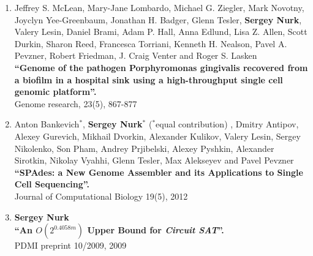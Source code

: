 \begin{enumerate}

\item Jeffrey S. McLean, Mary-Jane Lombardo, Michael G. Ziegler, Mark Novotny, Joyclyn Yee-Greenbaum, Jonathan H. Badger, Glenn Tesler, \textbf{Sergey Nurk}, Valery Lesin, Daniel Brami, Adam P. Hall, Anna Edlund, Lisa Z. Allen, Scott Durkin, Sharon Reed, Francesca Torriani, Kenneth H. Nealson, Pavel A. Pevzner, Robert Friedman, J. Craig Venter and Roger S. Lasken \\
\textbf{``Genome of the pathogen Porphyromonas gingivalis recovered from a biofilm in a hospital sink using a high-throughput single cell genomic platform''.} \\
Genome research, 23(5), 867-877

\item Anton Bankevich$^*$, \textbf{Sergey Nurk}$^*$ ($^*$equal contribution)%
, Dmitry Antipov, Alexey Gurevich, Mikhail Dvorkin, Alexander Kulikov, Valery Lesin, Sergey Nikolenko, Son Pham, Andrey Prjibelski, Alexey Pyshkin, Alexander Sirotkin, Nikolay Vyahhi, Glenn Tesler, Max Alekseyev and Pavel Pevzner \\
\textbf{``SPAdes: a New Genome Assembler and its Applications to Single Cell Sequencing''.}\\
Journal of Computational Biology 19(5), 2012

\item \textbf{Sergey Nurk} \\
\textbf{``An $O(2^{0.4058m})$ Upper Bound for \textit{Circuit SAT}''.}\\
PDMI preprint 10/2009, 2009
\end{enumerate}

